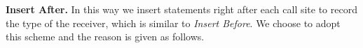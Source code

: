 \documentclass{fac}
\begin{document}
\textbf{Insert After.}
In this way we insert statements right after each call site to record the type of the receiver, which is similar to \emph{Insert Before}. We choose to adopt this scheme and the reason is given as follows.
\end{document}
